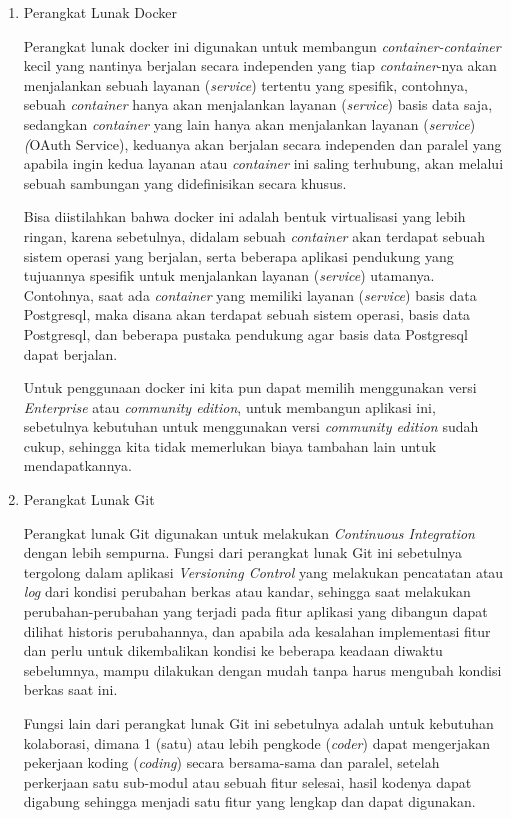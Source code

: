 \documentclass[pdftex,12pt, oneside]{article}
\begin{document}
\begin{enumerate}
		\item Perangkat Lunak Docker
		
		Perangkat lunak docker ini digunakan untuk membangun \textit{container-container} kecil yang nantinya berjalan secara independen yang tiap \textit{container}-nya akan menjalankan sebuah layanan (\textit{service}) tertentu yang spesifik, contohnya, sebuah \textit{container} hanya akan menjalankan layanan (\textit{service}) basis data saja, sedangkan \textit{container} yang lain hanya akan menjalankan layanan (\textit{service}) \textit({OAuth Service}), keduanya akan berjalan secara independen dan paralel yang apabila ingin kedua layanan atau \textit{container} ini saling terhubung, akan melalui sebuah sambungan yang didefinisikan secara khusus.
		
		Bisa diistilahkan bahwa docker ini adalah bentuk virtualisasi yang lebih ringan, karena sebetulnya, didalam sebuah \textit{container} akan terdapat sebuah sistem operasi yang berjalan, serta beberapa aplikasi pendukung yang tujuannya spesifik untuk menjalankan layanan (\textit{service}) utamanya. Contohnya, saat ada \textit{container} yang memiliki layanan (\textit{service}) basis data Postgresql, maka disana akan terdapat sebuah sistem operasi, basis data Postgresql, dan beberapa pustaka pendukung agar basis data Postgresql dapat berjalan.
		
		Untuk penggunaan docker ini kita pun dapat memilih menggunakan versi \textit{Enterprise} atau \textit{community edition}, untuk membangun aplikasi ini, sebetulnya kebutuhan untuk menggunakan versi \textit{community edition} sudah cukup, sehingga kita tidak memerlukan biaya tambahan lain untuk mendapatkannya.
		
		\item Perangkat Lunak Git
		
		Perangkat lunak Git digunakan untuk melakukan \textit{Continuous Integration} dengan lebih sempurna. Fungsi dari perangkat lunak Git ini sebetulnya tergolong dalam aplikasi \textit{Versioning Control} yang melakukan pencatatan atau \textit{log} dari kondisi perubahan berkas atau kandar, sehingga saat melakukan perubahan-perubahan yang terjadi pada fitur aplikasi yang dibangun dapat dilihat historis perubahannya, dan apabila ada kesalahan implementasi fitur dan perlu untuk dikembalikan kondisi ke beberapa keadaan diwaktu sebelumnya, mampu dilakukan dengan mudah tanpa harus mengubah kondisi berkas saat ini.
		
		Fungsi lain dari perangkat lunak Git ini sebetulnya adalah untuk kebutuhan kolaborasi, dimana 1 (satu) atau lebih pengkode (\textit{coder}) dapat mengerjakan pekerjaan koding (\textit{coding}) secara bersama-sama dan paralel, setelah perkerjaan satu sub-modul atau sebuah fitur selesai, hasil kodenya dapat digabung sehingga menjadi satu fitur yang lengkap dan dapat digunakan.
		

\end{enumerate}
\end{document}
